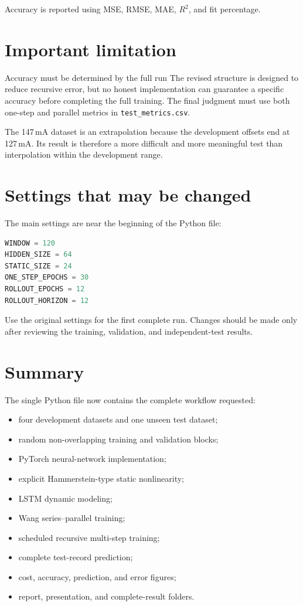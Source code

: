 \documentclass[11pt]{article}
\begin{document}
Accuracy is reported using MSE, RMSE, MAE, $R^2$, and fit percentage.

\section{Important limitation}

\begin{warningbox}{Accuracy must be determined by the full run}
The revised structure is designed to reduce recursive error, but no honest implementation can guarantee a specific accuracy before completing the full training. The final judgment must use both one-step and parallel metrics in \texttt{test\_metrics.csv}.
\end{warningbox}

The 147\,mA dataset is an extrapolation because the development offsets end at 127\,mA. Its result is therefore a more difficult and more meaningful test than interpolation within the development range.

\section{Settings that may be changed}

The main settings are near the beginning of the Python file:

\begin{lstlisting}[language=Python]
WINDOW = 120
HIDDEN_SIZE = 64
STATIC_SIZE = 24
ONE_STEP_EPOCHS = 30
ROLLOUT_EPOCHS = 12
ROLLOUT_HORIZON = 12
\end{lstlisting}

Use the original settings for the first complete run. Changes should be made only after reviewing the training, validation, and independent-test results.

\section{Summary}

The single Python file now contains the complete workflow requested:

\begin{itemize}[leftmargin=*]
\item four development datasets and one unseen test dataset;
\item random non-overlapping training and validation blocks;
\item PyTorch neural-network implementation;
\item explicit Hammerstein-type static nonlinearity;
\item LSTM dynamic modeling;
\item Wang series--parallel training;
\item scheduled recursive multi-step training;
\item complete test-record prediction;
\item cost, accuracy, prediction, and error figures;
\item report, presentation, and complete-result folders.
\end{itemize}
\end{document}
